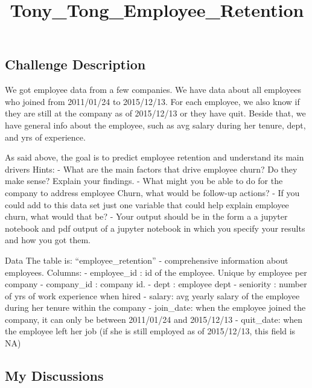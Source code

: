 \documentclass[11pt]{article}
\title{Tony\_Tong\_Employee\_Retention}
\begin{document}
    
    
    \maketitle
    
    

    
    \hypertarget{challenge-description}{%
\subsection{Challenge Description}\label{challenge-description}}

We got employee data from a few companies. We have data about all
employees who joined from 2011/01/24 to 2015/12/13. For each employee,
we also know if they are still at the company as of 2015/12/13 or they
have quit. Beside that, we have general info about the employee, such as
avg salary during her tenure, dept, and yrs of experience.

As said above, the goal is to predict employee retention and understand
its main drivers Hints: - What are the main factors that drive employee
churn? Do they make sense? Explain your findings. - What might you be
able to do for the company to address employee Churn, what would be
follow-up actions? - If you could add to this data set just one variable
that could help explain employee churn, what would that be? - Your
output should be in the form a a jupyter notebook and pdf output of a
jupyter notebook in which you specify your results and how you got them.

Data The table is: ``employee\_retention'' - comprehensive information
about employees. Columns: - employee\_id : id of the employee. Unique by
employee per company - company\_id : company id. - dept : employee dept
- seniority : number of yrs of work experience when hired - salary: avg
yearly salary of the employee during her tenure within the company -
join\_date: when the employee joined the company, it can only be between
2011/01/24 and 2015/12/13 - quit\_date: when the employee left her job
(if she is still employed as of 2015/12/13, this field is NA)

    \hypertarget{my-discussions}{%
\subsection{My Discussions}\label{my-discussions}}
\end{document}
